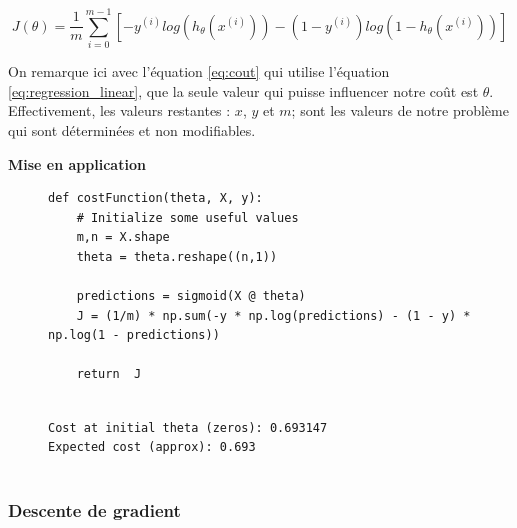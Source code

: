     \begin{equation}\label{eq:cout}
       J(\theta) = \frac{1}{m} \sum_{i=0}^{m-1}[-y^{(i)} log(h_\theta(x^{(i)})) - (1-y^{(i)}) log(1-h_\theta(x^{(i)}))]
    \end{equation}
 
    On remarque ici avec l'équation \ref{eq:cout} qui utilise l'équation \ref{eq:regression_linear}, que la seule valeur qui puisse influencer notre coût est $\theta$. Effectivement, les valeurs restantes : $x$, $y$ et $m$; sont les valeurs
    de notre problème qui sont déterminées et non modifiables.
    
    
    \vspace{.5cm}
    \noindent
    \textbf{Mise en application}
    \vspace{.2cm}

\begin{figure}[!h]
    \begin{minipage}{.48\linewidth}
\begin{verbatim}
def costFunction(theta, X, y):
    # Initialize some useful values
    m,n = X.shape   
    theta = theta.reshape((n,1)) 
                
    predictions = sigmoid(X @ theta)
    J = (1/m) * np.sum(-y * np.log(predictions) - (1 - y) * np.log(1 - predictions))
    
    return  J
\end{verbatim}   
    \end{minipage}\hfill
    \begin{minipage}{.48\linewidth}
\begin{verbatim}

Cost at initial theta (zeros): 0.693147
Expected cost (approx): 0.693
    
\end{verbatim}   
    \end{minipage}
\end{figure}

\clearpage

\subsubsection{Descente de gradient}

